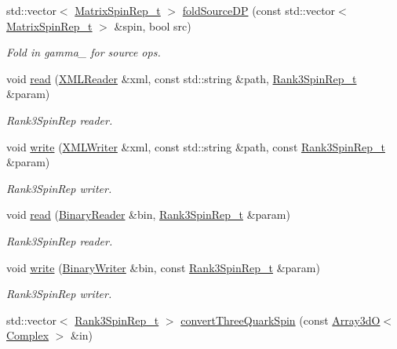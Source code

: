 \begin{DoxyCompactItemize}
std\+::vector$<$ \mbox{\hyperlink{structHadron_1_1MatrixSpinRep__t}{Matrix\+Spin\+Rep\+\_\+t}} $>$ \mbox{\hyperlink{namespaceHadron_a26162db6431302c5e52fbd5fafdbedae}{fold\+Source\+DP}} (const std\+::vector$<$ \mbox{\hyperlink{structHadron_1_1MatrixSpinRep__t}{Matrix\+Spin\+Rep\+\_\+t}} $>$ \&spin, bool src)
\begin{DoxyCompactList}\small\item\em Fold in gamma\+\_ for source ops. \end{DoxyCompactList}\item 
void \mbox{\hyperlink{namespaceHadron_a2d26ed6a48c098506babe8e03425a183}{read}} (\mbox{\hyperlink{classADATXML_1_1XMLReader}{X\+M\+L\+Reader}} \&xml, const std\+::string \&path, \mbox{\hyperlink{structHadron_1_1Rank3SpinRep__t}{Rank3\+Spin\+Rep\+\_\+t}} \&param)
\begin{DoxyCompactList}\small\item\em Rank3\+Spin\+Rep reader. \end{DoxyCompactList}\item 
void \mbox{\hyperlink{namespaceHadron_a4286761aeb6d750c12bfba02d54b2b12}{write}} (\mbox{\hyperlink{classADATXML_1_1XMLWriter}{X\+M\+L\+Writer}} \&xml, const std\+::string \&path, const \mbox{\hyperlink{structHadron_1_1Rank3SpinRep__t}{Rank3\+Spin\+Rep\+\_\+t}} \&param)
\begin{DoxyCompactList}\small\item\em Rank3\+Spin\+Rep writer. \end{DoxyCompactList}\item 
void \mbox{\hyperlink{namespaceHadron_aa7d26a465958f014ffb6f4cb4d45a389}{read}} (\mbox{\hyperlink{classADATIO_1_1BinaryReader}{Binary\+Reader}} \&bin, \mbox{\hyperlink{structHadron_1_1Rank3SpinRep__t}{Rank3\+Spin\+Rep\+\_\+t}} \&param)
\begin{DoxyCompactList}\small\item\em Rank3\+Spin\+Rep reader. \end{DoxyCompactList}\item 
void \mbox{\hyperlink{namespaceHadron_ae2b761452803d14604c4471a4cf35ca3}{write}} (\mbox{\hyperlink{classADATIO_1_1BinaryWriter}{Binary\+Writer}} \&bin, const \mbox{\hyperlink{structHadron_1_1Rank3SpinRep__t}{Rank3\+Spin\+Rep\+\_\+t}} \&param)
\begin{DoxyCompactList}\small\item\em Rank3\+Spin\+Rep writer. \end{DoxyCompactList}\item 
std\+::vector$<$ \mbox{\hyperlink{structHadron_1_1Rank3SpinRep__t}{Rank3\+Spin\+Rep\+\_\+t}} $>$ \mbox{\hyperlink{namespaceHadron_abbb775633773ccb52dcaef4974305df9}{convert\+Three\+Quark\+Spin}} (const \mbox{\hyperlink{classADAT_1_1Array3dO}{Array3dO}}$<$ \mbox{\hyperlink{group__defs_gabaa4aa11d5212d34042d08bf0b2f9cc0}{Complex}} $>$ \&in)

\end{DoxyCompactItemize}
